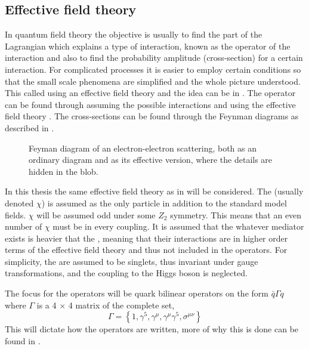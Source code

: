 \subsection{Effective field theory}\label{sec:tb:subsec:eft}
In quantum field theory the objective is usually to find the part of the Lagrangian which explains a type of interaction, known as the operator of the interaction and also to find the probability amplitude (cross-section) for a certain interaction. For complicated processes it is easier to employ certain conditions so that the small scale phenomena are simplified and the whole picture understood. This called using an effective field theory and the idea can be in . The operator can be found through assuming the possible interactions and using the effective field theory \citep{Zee:2003}. The cross-sections can be found through the Feynman diagrams as described in . 
 \begin{figure}[H] %
    \hfill
    \caption{Feyman diagram of an electron-electron scattering, both as an ordinary diagram and as its effective version, where the details are hidden in the blob.}
    \label{fig:feymanc}
  \end{figure}
In this thesis the same effective field theory as in \citep{82.116010,Goodman:2010} will be considered. The \abbrWIMP (usually denoted $\chi$) is assumed as the only particle in addition to the standard model fields. $\chi$ will be assumed odd under some $Z_2$ symmetry. This means that an even number of $\chi$ must be in every coupling. It is assumed that the whatever mediator exists is heavier that the \abbrWIMPS, meaning that their interactions are in higher order terms of the effective field theory and thus not included in the operators. For simplicity, the \abbrWIMPS are assumed to be \abbrSM singlets, thus invariant under \abbrSM gauge transformations, and the coupling to the Higgs boson is neglected.

The focus for the operators will be quark bilinear operators on the form $\bar{q}\Gamma q$ where $\Gamma$ is a 4 $\times$ 4 matrix of the complete set, 
\begin{equation}
\Gamma = \left\lbrace 1,\gamma ^5,\gamma ^\mu,\gamma ^\mu \gamma ^5, \sigma ^{\mu \nu} \right\rbrace
\end{equation}
This will dictate how the operators are written, more of why this is done can be found in \citep{82.116010,Goodman:2010,Zee:2003}.

